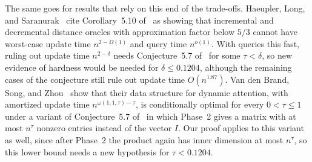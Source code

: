 The same goes for results that rely on this end of the trade-offs. Haeupler, Long, and Saranurak~\cite{HLS24} cite Corollary~5.10 of~\cite{BNS19} as showing that incremental and decremental distance oracles with approximation factor below $5/3$ cannot have worst-case update time $n^{2-\Omega(1)}$ and query time $n^{o(1)}$. With queries this fast, ruling out update time $n^{2-\delta}$ needs Conjecture~5.7 of~\cite{BNS19} for some $\tau<\delta$, so new evidence of hardness would be needed for $\delta\le0.1204$, although the remaining cases of the conjecture still rule out update time $O(n^{1.87})$. Van den Brand, Song, and Zhou~\cite{BSZ24} show that their data structure for dynamic attention, with amortized update time $n^{\omega(1,1,\tau)-\tau}$, is conditionally optimal for every $0<\tau\le1$ under a variant of Conjecture~5.7 of~\cite{BNS19} in which Phase~2 gives a matrix with at most $n^{\tau}$ nonzero entries instead of the vector $I$. Our proof applies to this variant as well, since after Phase~2 the product again has inner dimension at most $n^{\tau}$, so this lower bound needs a new hypothesis for $\tau<0.1204$.


